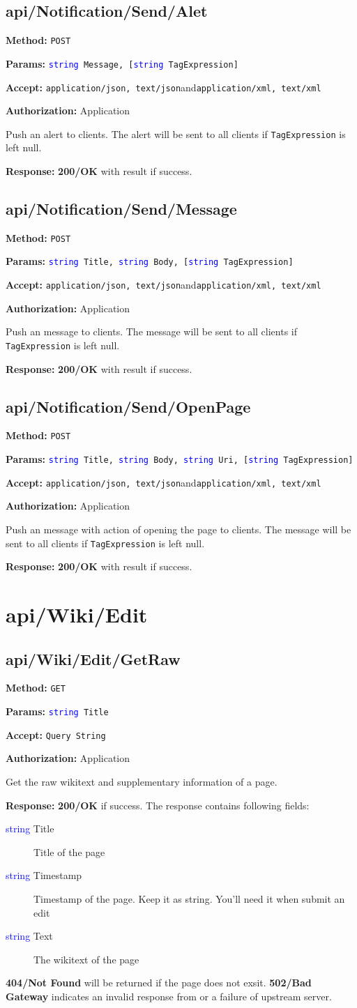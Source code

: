 \documentclass[a4paper,11pt]{report}
\newcommand{\method}[1]{\textsf{\textbf{Method:}} #1}
\newcommand{\params}[1]{\textsf{\textbf{Params:}} \texttt{#1}}
\newcommand{\accept}[1]{\textsf{\textbf{Accept:}} #1}
\newcommand{\response}[1]{\textsf{\textbf{Response:}} #1}
\newcommand{\auth}[1]{\textsf{\textbf{Authorization:}} #1}
\newcommand{\webapi}[6]{
    \method{#1}

    \params{#2}

    \accept{#3}

    \auth{#4}

    #5

    \response{#6}
    }
\newcommand{\sand}{\textsf{and}\xspace}
\newcommand{\httppost}{\texttt{POST}}
\newcommand{\httpget}{\texttt{GET}}
\newcommand{\json}{\texttt{application/json, text/json}\xspace}
\newcommand{\xml}{\texttt{application/xml, text/xml}\xspace}
\newcommand{\querystring}{\texttt{Query String}\xspace}
\newcommand{\ok}{\textbf{200/OK}\xspace}
\newcommand{\notfound}{\textbf{404/Not Found}\xspace}
\newcommand{\badgateway}{\textbf{502/Bad Gateway}\xspace}
\newcommand{\authapp}{Application}
\newcommand{\typestring}{\textcolor{blue}{string }}
\begin{document}
\subsection{api/Notification/Send/Alet}
\webapi
{\httppost}
{\typestring Message, [\typestring TagExpression]}
{\json \sand \xml}
{\authapp}
{Push an alert to clients. The alert will be sent to all clients if \texttt{TagExpression} is left null.}
{\ok with result if success.}

\subsection{api/Notification/Send/Message}
\webapi
{\httppost}
{\typestring Title, \typestring Body, [\typestring TagExpression]}
{\json \sand \xml}
{\authapp}
{Push an message to clients. The message will be sent to all clients if \texttt{TagExpression} is left null.}
{\ok with result if success.}

\subsection{api/Notification/Send/OpenPage}
\webapi
{\httppost}
{\typestring Title, \typestring Body, \typestring Uri, [\typestring TagExpression]}
{\json \sand \xml}
{\authapp}
{Push an message with action of opening the page to clients. The message will be sent to all clients if \texttt{TagExpression} is left null.}
{\ok with result if success.}

\section{api/Wiki/Edit}
\subsection{api/Wiki/Edit/GetRaw}
\label{sec:api:wiki:edit:getraw}
\webapi
{\httpget}
{\typestring Title}
{\querystring}
{\authapp}
{Get the raw wikitext and supplementary information of a page.}
{\ok if success. The response contains following fields:

\begin{description}
  \item[\textsf{\typestring Title}] Title of the page
  \item[\textsf{\typestring Timestamp}] Timestamp of the page. Keep it as string. You'll need it when submit an edit
  \item[\textsf{\typestring Text}] The wikitext of the page
\end{description}

\notfound will be returned if the page does not exsit. \badgateway indicates an invalid response from or a failure of upstream server.
}
\end{document}
